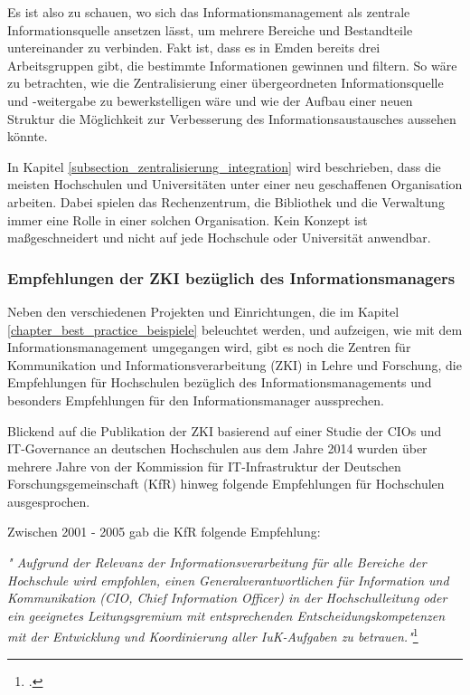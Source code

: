 Es ist also zu schauen, wo sich das Informationsmanagement als zentrale Informationsquelle ansetzen lässt, um mehrere Bereiche und Bestandteile untereinander zu verbinden. Fakt ist, dass es in Emden bereits drei Arbeitsgruppen gibt, die bestimmte Informationen gewinnen und filtern.  So wäre zu betrachten, wie die Zentralisierung einer übergeordneten Informationsquelle und -weitergabe zu bewerkstelligen wäre und wie der Aufbau einer neuen Struktur die Möglichkeit zur Verbesserung des Informationsaustausches aussehen könnte. 

In Kapitel \ref{subsection_zentralisierung_integration} wird beschrieben, dass die meisten Hochschulen und Universitäten unter einer neu geschaffenen Organisation arbeiten. Dabei spielen das Rechenzentrum, die Bibliothek und die Verwaltung immer eine Rolle in einer solchen Organisation. Kein Konzept ist maßgeschneidert und nicht auf jede Hochschule oder Universität anwendbar.

\subsubsection{Empfehlungen der ZKI bezüglich des Informationsmanagers}
\label{subsubsection_zki}

Neben den verschiedenen Projekten und Einrichtungen, die im Kapitel \ref{chapter_best_practice_beispiele} beleuchtet werden, und aufzeigen, wie mit dem Informationsmanagement umgegangen wird, gibt es noch die Zentren für Kommunikation und Informationsverarbeitung (ZKI) in Lehre und Forschung, die Empfehlungen für Hochschulen bezüglich des Informationsmanagements und besonders Empfehlungen für den Informationsmanager aussprechen.

Blickend auf die Publikation der ZKI basierend auf einer Studie der CIOs und IT-Governance an deutschen Hochschulen aus dem Jahre 2014 wurden über mehrere Jahre von der Kommission für IT-Infrastruktur der Deutschen Forschungsgemeinschaft (KfR) hinweg folgende Empfehlungen für Hochschulen ausgesprochen.

Zwischen 2001 - 2005 gab die KfR folgende Empfehlung:

\textit{" Aufgrund der Relevanz der Informationsverarbeitung für alle Bereiche der  Hochschule wird empfohlen, 
	einen Generalverantwortlichen für Information und  Kommunikation (CIO, Chief Information Officer) 
	in der Hochschulleitung oder ein geeignetes Leitungsgremium mit entsprechenden 
	Entscheidungskompetenzen mit der Entwicklung und  Koordinierung aller IuK-Aufgaben 
	zu betrauen."}\footcite[3]{zki_studie_cio_2014}

